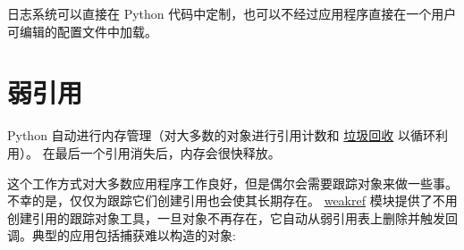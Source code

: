 \documentclass[a4paper,10pt,english]{sphinxmanual}
\begin{document}
日志系统可以直接在 Python 代码中定制，也可以不经过应用程序直接在一个用户可编辑的配置文件中加载。


\section{弱引用}
\label{stdlib2:id7}\label{stdlib2:tut-weak-references}
Python 自动进行内存管理（对大多数的对象进行引用计数和
\href{https://docs.python.org/3/glossary.html\#term-garbage-collection}{垃圾回收} 以循环利用）。
在最后一个引用消失后，内存会很快释放。

这个工作方式对大多数应用程序工作良好，但是偶尔会需要跟踪对象来做一些事。
不幸的是，仅仅为跟踪它们创建引用也会使其长期存在。 \href{https://docs.python.org/3/library/weakref.html\#module-weakref}{weakref}
模块提供了不用创建引用的跟踪对象工具，一旦对象不再存在，它自动从弱引用表上删除并触发回调。典型的应用包括捕获难以构造的对象:
\end{document}
